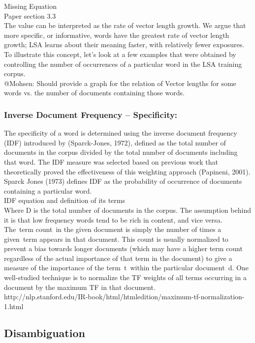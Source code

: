 Missing Equation\\
Paper section 3.3\\
The value can be interpreted as the rate of vector length growth. We argue that more specific, or informative, words have the greatest rate of vector length growth; LSA learns about their meaning faster, with relatively fewer exposures. To illustrate this concept, let's look at a few examples that were obtained by controlling the number of occurrences of a particular word in the LSA training corpus. \\
@Mohsen: Should provide a graph for the relation of Vector lengths for some words vs. the number of documents containing those words.\\

\subsubsection{Inverse Document Frequency – Specificity:}
The specificity of a word is determined using the inverse document frequency (IDF) introduced by (Sparck-Jones, 1972), defined as the total number of documents in the corpus divided by the total number of documents including that word. The IDF measure was selected based on previous work that theoretically proved the effectiveness of this weighting approach (Papineni, 2001). Sparck Jones (1973) defines IDF as the probability of occurrence of documents containing a particular word.\\
IDF equation and definition of its terms\\
Where D is the total number of documents in the corpus. The assumption behind it is that low frequency words tend to be rich in content, and vice versa.
The term count in the given document is simply the number of times a given term appears in that document. This count is usually normalized to prevent a bias towards longer documents (which may have a higher term count regardless of the actual importance of that term in the document) to give a measure of the importance of the term t within the particular document d. One well-studied technique is to normalize the TF weights of all terms occurring in a document by the maximum TF in that document.\\
http://nlp.stanford.edu/IR-book/html/htmledition/maximum-tf-normalization-1.html
\subsection{Disambiguation}
\lstset{language=Pascal}          %
 
